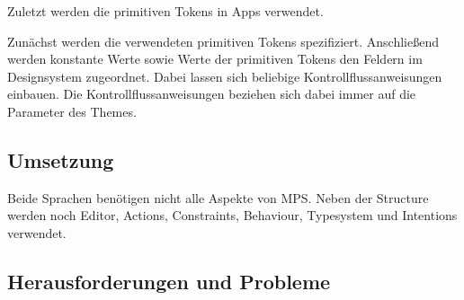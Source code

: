Zuletzt werden die primitiven Tokens in Apps verwendet.

Zunächst werden die verwendeten primitiven Tokens spezifiziert.
Anschließend werden konstante Werte sowie Werte der primitiven Tokens den Feldern im Designsystem zugeordnet.
Dabei lassen sich beliebige Kontrollflussanweisungen einbauen.
Die Kontrollflussanweisungen beziehen sich dabei immer auf die Parameter des Themes.

\subsection{Umsetzung}\label{subsec:umsetzung}
Beide Sprachen benötigen nicht alle Aspekte von \ac{MPS}.
Neben der Structure werden noch Editor, Actions, Constraints, Behaviour, Typesystem und Intentions verwendet.

\subsection{Herausforderungen und Probleme}\label{subsec:herausforderungen-und-probleme}
\lipsum[5]

